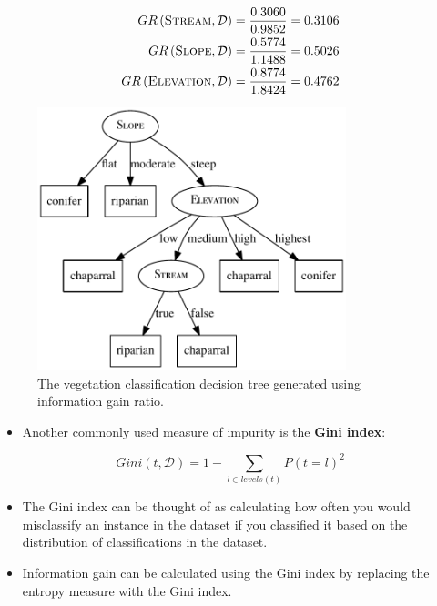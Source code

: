 \documentclass[xcolor={table}]{beamer}
\newcommand{\keyword}[1]{{\textbf{#1}}\index{#1}}
\newcommand{\featN}[1]{\textsc{#1}}
\begin{document}
 \begin{frame} 
\begin{equation*}
	\begin{alignedat}{2}
	GR\left(\featN{Stream},\mathcal{D}\right) & = \frac{0.3060}{0.9852} = 0.3106 \\
	GR\left(\featN{Slope},\mathcal{D}\right) & = \frac{0.5774}{1.1488} = 0.5026 \\
	GR\left(\featN{Elevation},\mathcal{D}\right) & = \frac{0.8774}{1.8424} = 0.4762 \\
	\end{alignedat}
\end{equation*}
\end{frame} 

 \begin{frame} 
\begin{figure}
\centerline{
	\includegraphics[width=0.8\textwidth]{./images/ex-hand-ecology-dectree5_mod.pdf}
}
\caption{The vegetation classification decision tree generated using information gain ratio.}
\label{fig:ex-hand-dectree5}
\end{figure}
\end{frame} 

 \begin{frame} 
\begin{itemize}
	\item Another commonly used measure of impurity is the \keyword{Gini index}:
\end{itemize}
\begin{equation}
Gini\left(t,\mathcal{D}\right) = 1 - \sum_{l \in levels(t)} P(t=l)^2
\label{eq:gini}
\end{equation}
\begin{itemize}
	\item  The Gini index can be thought of as calculating how often you would misclassify an instance in the dataset if you classified it based on the distribution of classifications in the dataset. 
	\item Information gain can be calculated using the Gini index by replacing the entropy measure with the Gini index.
\end{itemize}
\end{frame} 
\end{document}
